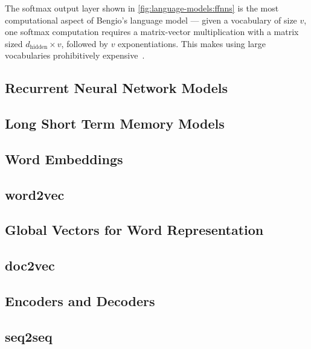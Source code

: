 The softmax output layer shown in \autoref{fig:language-models:ffnns} is the most computational aspect of Bengio's language model ---
given a vocabulary of size $v$, one softmax computation requires a matrix-vector multiplication with a matrix sized $d_\text{hidden} \times v$, followed by $v$ exponentiations.
This makes using large vocabularies prohibitively expensive~\cite{goldberg_2017}.

\subsection{Recurrent Neural Network Models}\label{sec:language-models:rnns}


\subsection{Long Short Term Memory Models}\label{sec:language-models:lstms}


\subsection{Word Embeddings}\label{sec:language-models:word-embeddings}
\subsection{word2vec}\label{sec:language-models:word2vec}
\subsection{Global Vectors for Word Representation}\label{sec:language-models:glove}
\subsection{doc2vec}\label{sec:language-models:doc2vec}

\subsection{Encoders and Decoders}\label{sec:language-models:encoders-decoders}
\subsection{seq2seq}\label{sec:language-models:seq2seq}

